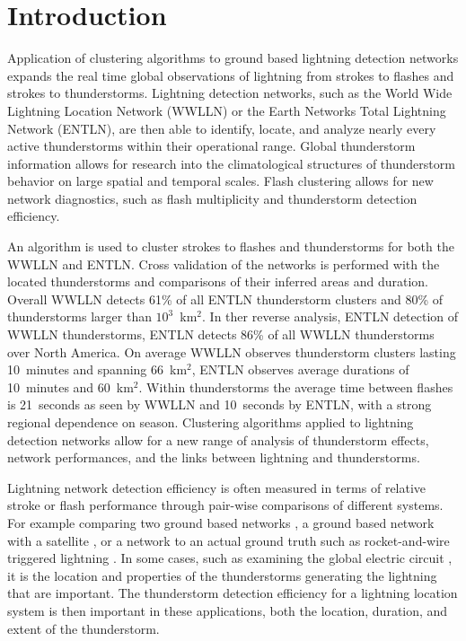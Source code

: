
\section{Introduction}

Application of clustering algorithms to ground based lightning detection networks expands the real time global observations of lightning from strokes to flashes and strokes to thunderstorms.
Lightning detection networks, such as the World Wide Lightning Location Network (WWLLN) or the Earth Networks Total Lightning Network (ENTLN), are then able to identify, locate, and analyze nearly every active thunderstorms within their operational range.
Global thunderstorm information allows for research into the climatological structures of thunderstorm behavior on large spatial and temporal scales.
Flash clustering allows for new network diagnostics, such as flash multiplicity and thunderstorm detection efficiency.

An algorithm is used to cluster strokes to flashes and thunderstorms for both the WWLLN and ENTLN.
Cross validation of the networks is performed with the located thunderstorms and comparisons of their inferred areas and duration.
Overall WWLLN detects 61\% of all ENTLN thunderstorm clusters and 80\% of thunderstorms larger than $10^3$~km$^2$.
In ther reverse analysis, ENTLN detection of WWLLN thunderstorms, ENTLN detects 86\% of all WWLLN thunderstorms over North America.
On average WWLLN observes thunderstorm clusters lasting 10~minutes and spanning 66~km$^2$, ENTLN observes average durations of 10~minutes and 60~km$^2$.
Within thunderstorms the average time between flashes is 21~seconds as seen by WWLLN and 10~seconds by ENTLN, with a strong regional dependence on season.
Clustering algorithms applied to lightning detection networks allow for a new range of analysis of thunderstorm effects, network performances, and the links between lightning and thunderstorms.

Lightning network detection efficiency is often measured in terms of relative stroke or flash performance through pair-wise comparisons of different systems.
For example comparing two ground based networks \citep{Abarca2010}, a ground based network with a satellite \citep{Rudlosky2013}, or a network to an actual ground truth such as rocket-and-wire triggered lightning \citep{Nag2011}.
In some cases, such as examining the global electric circuit \citep{Hutchins2014}, it is the location and properties of the thunderstorms generating the lightning that are important.
The thunderstorm detection efficiency for a lightning location system is then important in these applications, both the location, duration, and extent of the thunderstorm.


